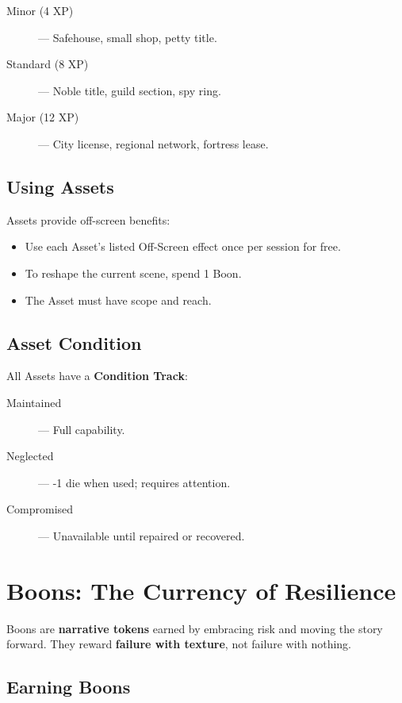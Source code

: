 \begin{description}
    \item[Minor (4 XP)] — Safehouse, small shop, petty title.
    \item[Standard (8 XP)] — Noble title, guild section, spy ring.
    \item[Major (12 XP)] — City license, regional network, fortress lease.
\end{description}

\subsection*{Using Assets}

Assets provide off-screen benefits:

\begin{itemize}
    \item Use each Asset's listed Off-Screen effect once per session for free.
    \item To reshape the current scene, spend 1 Boon.
    \item The Asset must have scope and reach.
\end{itemize}

\subsection*{Asset Condition}

All Assets have a \textbf{Condition Track}:

\begin{description}
    \item[Maintained] — Full capability.
    \item[Neglected] — -1 die when used; requires attention.
    \item[Compromised] — Unavailable until repaired or recovered.
\end{description}

\section*{Boons: The Currency of Resilience}

Boons are \textbf{narrative tokens} earned by embracing risk and moving the story forward. They reward \textbf{failure with texture}, not failure with nothing.

\subsection*{Earning Boons}

